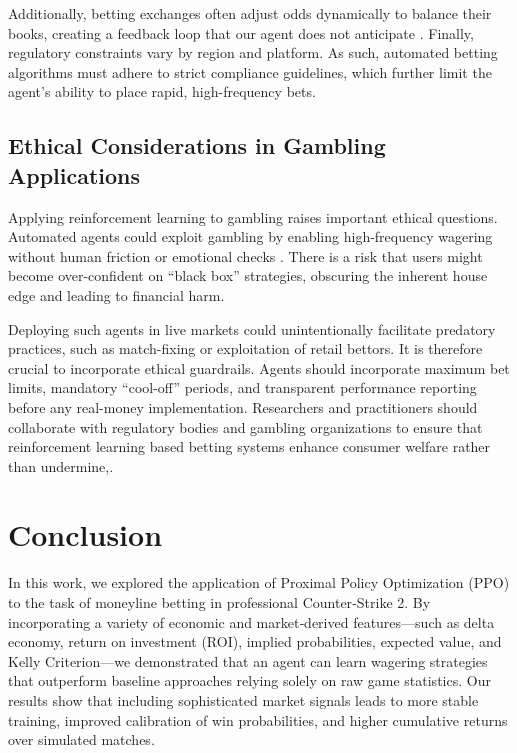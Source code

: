 \documentclass[sigconf]{acmart}
\begin{document}
Additionally, betting exchanges often adjust odds dynamically to balance their books, creating a feedback loop that our agent does not anticipate \cite{jansen2020rlbetting}. Finally, regulatory constraints vary by region and platform. As such, automated betting algorithms must adhere to strict compliance guidelines, which further limit the agent's ability to place rapid, high-frequency bets.

\subsection{Ethical Considerations in Gambling Applications}

Applying reinforcement learning to gambling raises important ethical questions. Automated agents could exploit gambling by enabling high-frequency wagering without human friction or emotional checks \cite{king2019ethics}. There is a risk that users might become over-confident on “black box” strategies, obscuring the inherent house edge and leading to financial harm.

Deploying such agents in live markets could unintentionally facilitate predatory practices, such as match-fixing or exploitation of retail bettors. It is therefore crucial to incorporate ethical guardrails. Agents should incorporate maximum bet limits, mandatory “cool-off” periods, and transparent performance reporting before any real-money implementation. Researchers and practitioners should collaborate with regulatory bodies and gambling organizations to ensure that reinforcement learning based betting systems enhance consumer welfare rather than undermine,.

\section{Conclusion}

In this work, we explored the application of Proximal Policy Optimization (PPO) to the task of moneyline betting in professional Counter‐Strike 2. By incorporating a variety of economic and market‐derived features—such as delta economy, return on investment (ROI), implied probabilities, expected value, and Kelly Criterion—we demonstrated that an agent can learn wagering strategies that outperform baseline approaches relying solely on raw game statistics. Our results show that including sophisticated market signals leads to more stable training, improved calibration of win probabilities, and higher cumulative returns over simulated matches.
\end{document}
